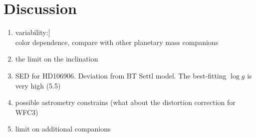\documentclass[modern]{aastex62}
\begin{document}


\section{Discussion}
\begin{enumerate}
\item variability:]\\
  color dependence, compare with other planetary mass companions
\item the limit on the inclination \citep[see][]{Vos2017}
  
\item SED for HD106906. Deviation from BT Settl model. The best-fitting $\log g$ is very high (5.5)
\item possible astrometry constrains (what about the distortion correction for WFC3)\\
\item limit on additional companions\\
  \end{enumerate}



\end{document}
